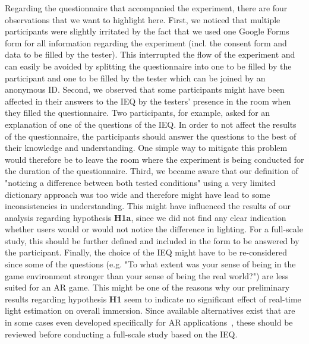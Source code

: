 \documentclass[12pt,twoside,english]{article}
\begin{document}
Regarding the questionnaire that accompanied the experiment, there are four observations that we want to highlight here.
First, we noticed that multiple participants were slightly irritated by the fact that we used one Google Forms form for all information regarding the experiment (incl. the consent form and data to be filled by the tester).
This interrupted the flow of the experiment and can easily be avoided by splitting the questionnaire into one to be filled by the participant and one to be filled by the tester which can be joined by an anonymous ID.
Second, we observed that some participants might have been affected in their answers to the \gls{IEQ} by the testers' presence in the room when they filled the questionnaire.
Two participants, for example, asked for an explanation of one of the questions of the \gls{IEQ}.
In order to not affect the results of the questionnaire, the participants should answer the questions to the best of their knowledge and understanding.
One simple way to mitigate this problem would therefore be to leave the room where the experiment is being conducted for the duration of the questionnaire.
Third, we became aware that our definition of "noticing a difference between both tested conditions" using a very limited dictionary approach was too wide and therefore might have lead to some inconsistencies in understanding.
This might have influenced the results of our analysis regarding hypothesis \textbf{H1a}, since we did not find any clear indication whether users would or would not notice the difference in lighting.
For a full-scale study, this should be further defined and included in the form to be answered by the participant.
Finally, the choice of the \gls{IEQ} might have to be re-considered since some of the questions (e.g. "To what extent was your sense of being in the game environment stronger than your sense of being the real world?") are less suited for an \gls{AR} game.
This might be one of the reasons why our preliminary results regarding hypothesis \textbf{H1} seem to indicate no significant effect of real-time light estimation on overall immersion.
Since available alternatives exist that are in some cases even developed specifically for \gls{AR} applications~\cite{georgiou_development_2017}, these should be reviewed before conducting a full-scale study based on the \gls{IEQ}.
\end{document}
